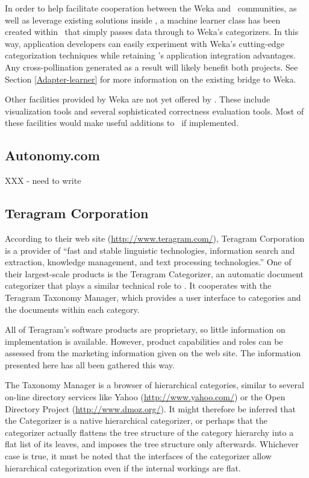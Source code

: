 In order to help facilitate cooperation between the Weka and
\aicat\ communities, as well as leverage existing solutions
inside \aicat, a machine learner class has been created
within \aicat\ that simply passes data through to Weka's
categorizers.  In this way, application developers can easily
experiment with Weka's cutting-edge categorization techniques while
retaining \aicat's application integration advantages.  Any
cross-pollination generated as a result will likely benefit both
projects.  See Section \ref{Adapter-learner} for more information on
the existing bridge to Weka.

Other facilities provided by Weka are not yet offered by
\aicat.  These include visualization tools and several
sophisticated correctness evaluation tools.  Most of these
facilities would make useful additions to \aicat\ if
implemented.

\subsection{Autonomy.com}

XXX - need to write

\subsection{Teragram Corporation}

According to their web site (\url{http://www.teragram.com/}), Teragram
Corporation is a provider of ``fast and stable linguistic
technologies, information search and extraction, knowledge management,
and text processing technologies.''  One of their largest-scale
products is the Teragram Categorizer, an automatic document
categorizer that plays a similar technical role to \aicat.
It cooperates with the Teragram Taxonomy Manager, which provides a
user interface to categories and the documents within each category.

All of Teragram's software products are proprietary, so little
information on implementation is available.  However, product
capabilities and roles can be assessed from the marketing information
given on the web site.  The information presented here has all been
gathered this way.

The Taxonomy Manager is a browser of hierarchical categories, similar
to several on-line directory services like Yahoo
(\url{http://www.yahoo.com/}) or the Open Directory Project
(\url{http://www.dmoz.org/}).  It might therefore be inferred that the
Categorizer is a native hierarchical categorizer, or perhaps that the
categorizer actually flattens the tree structure of the category
hierarchy into a flat list of its leaves, and imposes the tree
structure only afterwards.  Whichever case is true, it must be noted
that the interfaces of the categorizer allow hierarchical
categorization even if the internal workings are flat.

